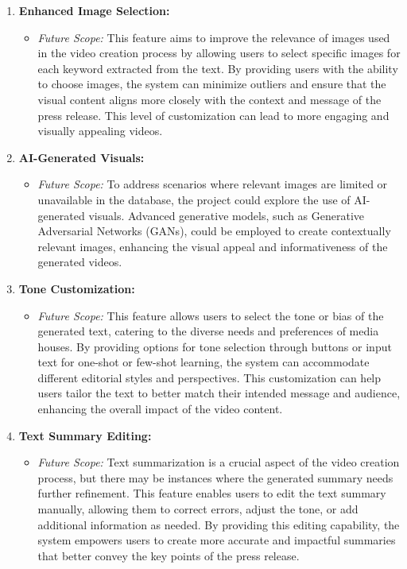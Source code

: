 \documentclass[12pt]{article}
\begin{document}
\begin{enumerate}[label=\arabic*.]
    \item \textbf{Enhanced Image Selection:}
    \begin{itemize}
        \item \textit{Future Scope:} This feature aims to improve the relevance of images used in the video creation process by allowing users to select specific images for each keyword extracted from the text. By providing users with the ability to choose images, the system can minimize outliers and ensure that the visual content aligns more closely with the context and message of the press release. This level of customization can lead to more engaging and visually appealing videos.
    \end{itemize}

    \item \textbf{AI-Generated Visuals:}
    \begin{itemize}
        \item \textit{Future Scope:} To address scenarios where relevant images are limited or unavailable in the database, the project could explore the use of AI-generated visuals. Advanced generative models, such as Generative Adversarial Networks (GANs), could be employed to create contextually relevant images, enhancing the visual appeal and informativeness of the generated videos.
    \end{itemize}

    \item \textbf{Tone Customization:}
    \begin{itemize}
        \item \textit{Future Scope:} This feature allows users to select the tone or bias of the generated text, catering to the diverse needs and preferences of media houses. By providing options for tone selection through buttons or input text for one-shot or few-shot learning, the system can accommodate different editorial styles and perspectives. This customization can help users tailor the text to better match their intended message and audience, enhancing the overall impact of the video content.
    \end{itemize}

    \item \textbf{Text Summary Editing:}
    \begin{itemize}
        \item \textit{Future Scope:} Text summarization is a crucial aspect of the video creation process, but there may be instances where the generated summary needs further refinement. This feature enables users to edit the text summary manually, allowing them to correct errors, adjust the tone, or add additional information as needed. By providing this editing capability, the system empowers users to create more accurate and impactful summaries that better convey the key points of the press release.
    \end{itemize}


\end{enumerate}
\end{document}
